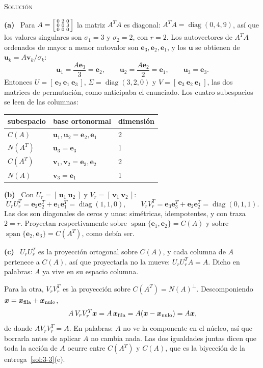 \documentclass[11pt,a4paper]{article}
\newcommand{\bi}[1]{\boldsymbol{#1}}
\newcommand{\bu}{\bi{u}}  \newcommand{\bv}{\bi{v}}  \newcommand{\bw}{\bi{w}}
\DeclareMathOperator{\gen}{span}
\DeclareMathOperator{\diag}{diag}
\newcounter{entrega}[section]
\newcommand{\solucion}{\par\medskip\noindent\textsc{Solución}\par\nobreak\smallskip\noindent}
\newcommand{\itemsol}[1]{\par\medskip\noindent\textbf{(#1)}\ \ignorespaces}
\begin{document}
\solucion
\itemsol{a} Para $A=\begin{bsmallmatrix}0&2&0\\0&0&3\\0&0&0\end{bsmallmatrix}$ la
matriz $A^TA$ es diagonal: $A^TA=\diag(0,4,9)$, así que los valores singulares
son $\sigma_1=3$ y $\sigma_2=2$, con $r=2$. Los autovectores de $A^TA$ ordenados
de mayor a menor autovalor son $\bi{e}_3,\bi{e}_2,\bi{e}_1$, y los $\bu$ se
obtienen de $\bu_k=A\bv_k/\sigma_k$:
\[
\bu_1=\frac{A\bi{e}_3}{3}=\bi{e}_2,\qquad
\bu_2=\frac{A\bi{e}_2}{2}=\bi{e}_1,\qquad
\bu_3=\bi{e}_3 .
\]
Entonces $U=[\,\bi{e}_2\ \bi{e}_1\ \bi{e}_3\,]$, $\Sigma=\diag(3,2,0)$ y
$V=[\,\bi{e}_3\ \bi{e}_2\ \bi{e}_1\,]$, las dos matrices de permutación, como
anticipaba el enunciado. Los cuatro subespacios se leen de las columnas:
\begin{center}
\begin{tabular}{@{}lll@{}}
\hline
subespacio & base ortonormal & dimensión\\
\hline
$C(A)$ & $\bu_1,\bu_2=\bi{e}_2,\bi{e}_1$ & 2\\
$N(A^T)$ & $\bu_3=\bi{e}_3$ & 1\\
$C(A^T)$ & $\bv_1,\bv_2=\bi{e}_3,\bi{e}_2$ & 2\\
$N(A)$ & $\bv_3=\bi{e}_1$ & 1\\
\hline
\end{tabular}
\end{center}

\itemsol{b} Con $U_r=[\,\bu_1\ \bu_2\,]$ y $V_r=[\,\bv_1\ \bv_2\,]$:
\[
U_rU_r^{T}=\bi{e}_2\bi{e}_2^{T}+\bi{e}_1\bi{e}_1^{T}=\diag(1,1,0),\qquad
V_rV_r^{T}=\bi{e}_3\bi{e}_3^{T}+\bi{e}_2\bi{e}_2^{T}=\diag(0,1,1).
\]
Las dos son diagonales de ceros y unos: simétricas, idempotentes, y con traza
$2=r$. Proyectan respectivamente sobre $\gen\{\bi{e}_1,\bi{e}_2\}=C(A)$ y sobre
$\gen\{\bi{e}_2,\bi{e}_3\}=C(A^T)$, como debía ser.

\itemsol{c} $U_rU_r^T$ es la proyección ortogonal sobre $C(A)$, y cada columna de
$A$ pertenece a $C(A)$, así que proyectarla no la mueve: $U_rU_r^TA=A$. Dicho en
palabras: $A$ ya vive en su espacio columna.

Para la otra, $V_rV_r^T$ es la proyección sobre $C(A^T)=N(A)^{\perp}$.
Descomponiendo $\bx=\bx_{\text{fila}}+\bx_{\text{nulo}}$,
\[
A\,V_rV_r^{T}\bx=A\,\bx_{\text{fila}}=A(\bx-\bx_{\text{nulo}})=A\bx ,
\]
de donde $AV_rV_r^T=A$. En palabras: $A$ no ve la componente en el núcleo, así
que borrarla antes de aplicar $A$ no cambia nada. Las dos igualdades juntas dicen
que toda la acción de $A$ ocurre entre $C(A^T)$ y $C(A)$, que es la biyección de
la entrega~\ref{sol:3-3}(e).
\end{document}
